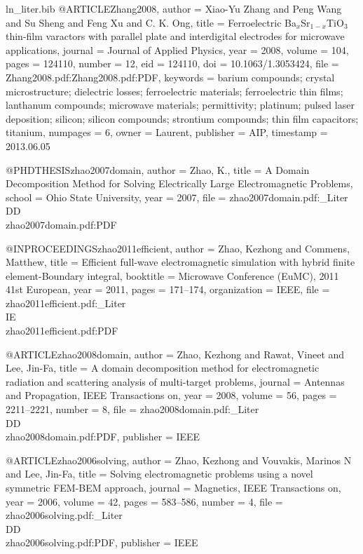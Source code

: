 \begin{filecontents*}{ln_liter.bib}
@ARTICLE{Zhang2008,
  author = {Xiao-Yu Zhang and Peng Wang and Su Sheng and Feng Xu and C. K. Ong},
  title = {Ferroelectric {Ba}$_x${Sr}$_{1 - x}${TiO}$_3$ thin-film varactors
	with parallel plate and interdigital electrodes for microwave applications},
  journal = {Journal of Applied Physics},
  year = {2008},
  volume = {104},
  pages = {124110},
  number = {12},
  eid = {124110},
  doi = {10.1063/1.3053424},
  file = {Zhang2008.pdf:Zhang2008.pdf:PDF},
  keywords = {barium compounds; crystal microstructure; dielectric losses; ferroelectric
	materials; ferroelectric thin films; lanthanum compounds; microwave
	materials; permittivity; platinum; pulsed laser deposition; silicon;
	silicon compounds; strontium compounds; thin film capacitors; titanium},
  numpages = {6},
  owner = {Laurent},
  publisher = {AIP},
  timestamp = {2013.06.05}
}

@PHDTHESIS{zhao2007domain,
  author = {Zhao, K.},
  title = {A Domain Decomposition Method for Solving Electrically Large Electromagnetic
	Problems},
  school = {Ohio State University},
  year = {2007},
  file = {zhao2007domain.pdf:_Liter\\DD\\zhao2007domain.pdf:PDF}
}

@INPROCEEDINGS{zhao2011efficient,
  author = {Zhao, Kezhong and Commens, Matthew},
  title = {Efficient full-wave electromagnetic simulation with hybrid finite
	element-Boundary integral},
  booktitle = {Microwave Conference (EuMC), 2011 41st European},
  year = {2011},
  pages = {171--174},
  organization = {IEEE},
  file = {zhao2011efficient.pdf:_Liter\\IE\\zhao2011efficient.pdf:PDF}
}

@ARTICLE{zhao2008domain,
  author = {Zhao, Kezhong and Rawat, Vineet and Lee, Jin-Fa},
  title = {A domain decomposition method for electromagnetic radiation and scattering
	analysis of multi-target problems},
  journal = {Antennas and Propagation, IEEE Transactions on},
  year = {2008},
  volume = {56},
  pages = {2211--2221},
  number = {8},
  file = {zhao2008domain.pdf:_Liter\\DD\\zhao2008domain.pdf:PDF},
  publisher = {IEEE}
}

@ARTICLE{zhao2006solving,
  author = {Zhao, Kezhong and Vouvakis, Marinos N and Lee, Jin-Fa},
  title = {Solving electromagnetic problems using a novel symmetric {FEM-BEM}
	approach},
  journal = {Magnetics, IEEE Transactions on},
  year = {2006},
  volume = {42},
  pages = {583--586},
  number = {4},
  file = {zhao2006solving.pdf:_Liter\\DD\\zhao2006solving.pdf:PDF},
  publisher = {IEEE}
}


\end{filecontents*}
